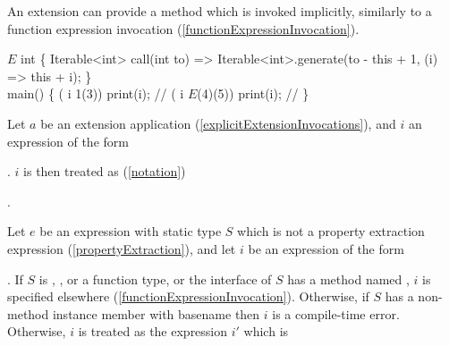 \documentclass[makeidx]{article}
\begin{document}
\LMHash{}%
An extension can provide a \CALL{} method which is invoked implicitly,
similarly to a function expression invocation
(\ref{functionExpressionInvocation}).


\begin{dartCode}
\EXTENSION{} $E$ \ON{} int \{
  Iterable<int> call(int to) =>
      Iterable<int>.generate(to - this + 1, (i) => this + i);
\}
\\
\VOID{} main() \{
  \FOR{} (\VAR{} i \IN{} 1(3)) print(i); // 
  \FOR{} (\VAR{} i \IN{} $E$(4)(5)) print(i); // 
\}
\end{dartCode}


\LMHash{}%
%
Let $a$ be an extension application
(\ref{explicitExtensionInvocations}),
and $i$ an expression of the form

\noindent
{}

\noindent
{}.
$i$ is then treated as
(\ref{notation})

\noindent
{}.


\LMHash{}%
%
Let $e$ be an expression with static type $S$
which is not a property extraction expression
(\ref{propertyExtraction}),
and let $i$ be an expression of the form

\noindent
{}

\noindent
{}.
If $S$ is \DYNAMIC, \FUNCTION, or a function type,
or the interface of $S$ has a method named \CALL,
$i$ is specified elsewhere
(\ref{functionExpressionInvocation}).
Otherwise, if $S$ has a non-method instance member with basename \CALL{}
then $i$ is a compile-time error.
Otherwise, $i$ is treated as the expression $i'$ which is
\end{document}
